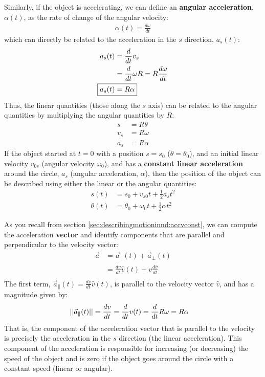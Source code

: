 Similarly, if the object is accelerating, we can define an \textbf{angular acceleration}, $\alpha(t)$, as the rate of change of the angular velocity:
\begin{align*}
\alpha(t)=\frac{d\omega}{dt}
\end{align*}
which can directly be related to the acceleration in the $s$ direction, $a_s(t)$:
\begin{align*}
a_s(t) &= \frac{d}{dt}v_s\\
&=\frac{d}{dt}\omega R=R\frac{d\omega}{dt}\\
\Aboxed{a_s(t)&=R\alpha }
\end{align*}
Thus, the linear quantities (those along the $s$ axis) can be related to the angular quantities by multiplying the angular quantities by $R$:
\begin{align}
s&=R\theta\\
v_s&=R\omega\\
a_s&=R\alpha
\end{align}
If the object started at $t=0$ with a position $s=s_0$ ($\theta=\theta_0$), and an initial linear velocity $v_{0s}$ (angular velocity $\omega_0$), and has a \textbf{constant linear acceleration} around the circle, $a_s$ (angular acceleration, $\alpha$), then the position of the object can be described using either the linear or the angular quantities:
\begin{align*}
s(t) &= s_0+v_{s0}t+\frac{1}{2}a_s t^2\\
\theta(t) &= \theta_0+\omega_0t+\frac{1}{2}\alpha t^2
\end{align*}

As you recall from section \ref{sec:describingmotioninnd:accvconst}, we can compute the acceleration \textbf{vector} and identify components that are parallel and perpendicular to the velocity vector:
\begin{align*}
\vec a&=\vec a_{\parallel}(t) + \vec a_{\bot}(t)\\
&=\frac{dv}{dt}\hat v(t)+v\frac{d\hat v}{dt}\\
\end{align*}
The first term, $\vec a_{\parallel}(t)=\frac{dv}{dt}\hat v(t)$, is parallel to the velocity vector $\hat v$, and has a magnitude given by:
\begin{align*}
||\vec a_{\parallel}(t)||&=\frac{dv}{dt}=\frac{d}{dt} v(t)=\frac{d}{dt} R\omega=R\alpha
\end{align*}
That is, the component of the acceleration vector that is parallel to the velocity is precisely the acceleration in the $s$ direction (the linear acceleration). This component of the acceleration is responsible for increasing (or decreasing) the speed of the object and is zero if the object goes around the circle with a constant speed (linear or angular). 

